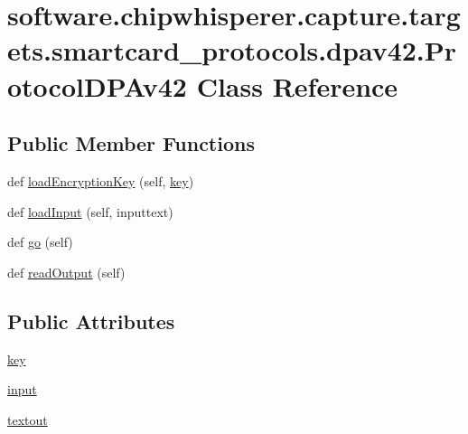 \hypertarget{classsoftware_1_1chipwhisperer_1_1capture_1_1targets_1_1smartcard__protocols_1_1dpav42_1_1ProtocolDPAv42}{}\section{software.\+chipwhisperer.\+capture.\+targets.\+smartcard\+\_\+protocols.\+dpav42.\+Protocol\+D\+P\+Av42 Class Reference}
\label{classsoftware_1_1chipwhisperer_1_1capture_1_1targets_1_1smartcard__protocols_1_1dpav42_1_1ProtocolDPAv42}
\subsection*{Public Member Functions}
\begin{DoxyCompactItemize}
\item 
def \hyperlink{classsoftware_1_1chipwhisperer_1_1capture_1_1targets_1_1smartcard__protocols_1_1dpav42_1_1ProtocolDPAv42_a78431752cc67e17e28fdb44a9496ea64}{load\+Encryption\+Key} (self, \hyperlink{classsoftware_1_1chipwhisperer_1_1capture_1_1targets_1_1smartcard__protocols_1_1dpav42_1_1ProtocolDPAv42_a72602a597c90a3b823a6520fc6756310}{key})
\item 
def \hyperlink{classsoftware_1_1chipwhisperer_1_1capture_1_1targets_1_1smartcard__protocols_1_1dpav42_1_1ProtocolDPAv42_acc15a624a8e0067d75f4303b9907f6ac}{load\+Input} (self, inputtext)
\item 
def \hyperlink{classsoftware_1_1chipwhisperer_1_1capture_1_1targets_1_1smartcard__protocols_1_1dpav42_1_1ProtocolDPAv42_a3d70573a6fb967f865fbda9adbfa9e88}{go} (self)
\item 
def \hyperlink{classsoftware_1_1chipwhisperer_1_1capture_1_1targets_1_1smartcard__protocols_1_1dpav42_1_1ProtocolDPAv42_a11c1518750655bd40b566dc3c2e54669}{read\+Output} (self)
\end{DoxyCompactItemize}
\subsection*{Public Attributes}
\begin{DoxyCompactItemize}
\item 
\hyperlink{classsoftware_1_1chipwhisperer_1_1capture_1_1targets_1_1smartcard__protocols_1_1dpav42_1_1ProtocolDPAv42_a72602a597c90a3b823a6520fc6756310}{key}
\item 
\hyperlink{classsoftware_1_1chipwhisperer_1_1capture_1_1targets_1_1smartcard__protocols_1_1dpav42_1_1ProtocolDPAv42_a2da3fcce3cf29c21a289749276b48542}{input}
\item 
\hyperlink{classsoftware_1_1chipwhisperer_1_1capture_1_1targets_1_1smartcard__protocols_1_1dpav42_1_1ProtocolDPAv42_a9003187c95eb3e75f3383c51a0705950}{textout}
\end{DoxyCompactItemize}


